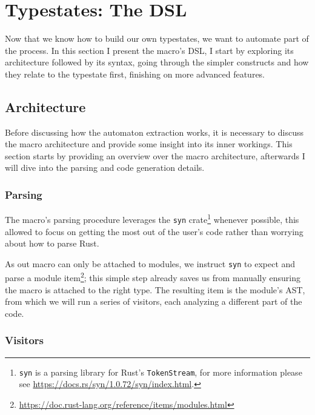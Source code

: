 \section{Typestates: The DSL}\label{sec:macro-dsl}

Now that we know how to build our own typestates,
we want to automate part of the process.
In this section I present the macro's DSL,
I start by exploring its architecture followed by its syntax,
going through the simpler constructs and how they relate to the typestate first,
finishing on more advanced features.

\subsection{Architecture}\label{sec:macro-dsl:architecture}

Before discussing how the automaton extraction works, it is necessary to discuss the macro architecture and
provide some insight into its inner workings.
This section starts by providing an overview over the macro architecture,
afterwards I will dive into the parsing and code generation details.




\subsubsection{Parsing}

The macro's parsing procedure leverages the \texttt{syn} crate\footnote{\texttt{syn} is a parsing library for Rust's \texttt{TokenStream},
for more information please see \url{https://docs.rs/syn/1.0.72/syn/index.html}.} whenever possible,
this allowed to focus on getting the most out of the user's code rather than worrying about how to parse Rust.

As out macro can only be attached to modules,
we instruct \texttt{syn} to expect and parse a module item\footnote{\url{https://doc.rust-lang.org/reference/items/modules.html}};
this simple step already saves us from manually ensuring the macro is attached to the right type.
The resulting item is the module's \gls{AST}, from which we will run a series of visitors,
each analyzing a different part of the code. %

\subsubsection{Visitors}

